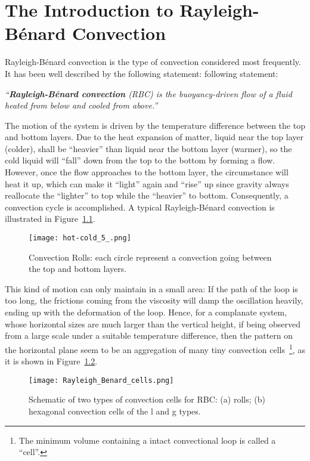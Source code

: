 \chapter{\label{chap:01}The Introduction to Rayleigh-B\'enard Convection}

Rayleigh-B\'enard convection is the type of convection considered most frequently. It has been well described by the following statement:
following statement:
\begin{center}
\parbox[c]{0.9\linewidth}{\textit{``\textbf{Rayleigh-B\'enard convection} (RBC) is the buoyancy-driven flow of a fluid heated from below and cooled from above.''}}
\end{center}
The motion of the system is driven by the temperature difference between the top and bottom layers. Due to the heat expansion of matter, liquid near the top layer (colder), shall be ``heavier'' than liquid near the bottom layer (warmer), so the cold liquid will ``fall'' down from the top to the bottom by forming a flow. However, once the flow approaches to the bottom layer, the circumstance will heat it up, which can make it ``light'' again and ``rise'' up since gravity always reallocate the ``lighter'' to top while the ``heavier'' to bottom. Consequently, a convection cycle is accomplished. A typical Rayleigh-B\'enard convection is illustrated in Figure~\ref{fig:RBC_roll}.\par
\begin{figure}[!ht]
	\centering
	\texttt{[image: hot-cold\_5\_.png]}
	\caption{Convection Rolls: each circle represent a convection going between the top and bottom layers.}
	\label{fig:RBC_roll}
\end{figure}
This kind of motion can only maintain in a small area: If the path of the loop is too long, the frictions coming from the viscosity will damp the oscillation heavily, ending up with the deformation of the loop. Hence, for a complanate system, whose horizontal sizes are much larger than the vertical height, if being observed from a large scale under a suitable temperature difference, then the pattern on the horizontal plane seem to be an aggregation of many tiny convection cells~\footnote{The minimum volume containing a intact convectional loop is called a ``cell''.}, as it is shown in Figure~\ref{fig:RBC_cell}.\par
\begin{figure}[!ht]
	\centering
	\texttt{[image: Rayleigh\_Benard\_cells.png]}
	\caption{Schematic of two types of convection cells for RBC: (a) rolls; (b) hexagonal convection cells of the l and g types.}
	\label{fig:RBC_cell}
\end{figure}
